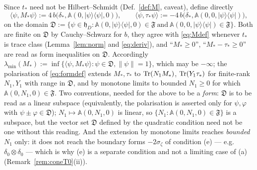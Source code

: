 \documentclass[11pt]{article}
\newcommand{\hh}{\mathfrak h}
\newcommand{\Aop}{\mathbb A}
\begin{document}
\begin{definition}\label{def:forms}
Since $t_*$ need not be Hilbert--Schmidt (Def.~\ref{def:M}, caveat), define directly
\begin{equation}\label{eq:formdef}
 \langle\psi,M_*\psi\rangle:=4\,b\bigl(\delta_*,\Aop(0,|\psi\rangle\langle\psi|,0)\bigr),
 \qquad
 \langle\psi,\tau_*\psi\rangle:=-4\,b\bigl(\delta_*,\Aop(0,0,|\psi\rangle\langle\psi|)\bigr),
\end{equation}
on the domain
$\mathfrak D:=\{\psi\in\hh_D:\Aop(0,|\psi\rangle\langle\psi|,0)\in\mathfrak F\ \text{and}\
\Aop(0,0,|\psi\rangle\langle\psi|)\in\mathfrak F\}$.  Both are finite on $\mathfrak D$ by
Cauchy--Schwarz for $b$, they agree with \eqref{eq:Mdef} whenever $t_*$ is trace class
(Lemma~\ref{lem:norm} and \eqref{eq:deriv}), and ``$M_*\ge0$'', ``$M_*-\tau_*\ge0$'' are
read as form inequalities on $\mathfrak D$.  Accordingly
$\lambda_{\min}(M_*):=\inf\{\langle\psi,M_*\psi\rangle:\psi\in\mathfrak D,\|\psi\|=1\}$,
which may be $-\infty$; the polarisation of \eqref{eq:formdef} extends $M_*,\tau_*$ to
$\operatorname{Tr}(N_1M_*)$, $\operatorname{Tr}(Y_1\tau_*)$ for finite-rank $N_1,Y_1$ with range in $\mathfrak D$, and
by monotone limits to bounded $N_1\ge0$ for which $\Aop(0,N_1,0)\in\mathfrak F$.  Two
conventions, needed for the above to be a \emph{form}: $\mathfrak D$ is to be read as a
linear subspace (equivalently, the polarisation is asserted only for $\psi,\varphi$ with
$\psi\pm\varphi\in\mathfrak D$); $N_1\mapsto\Aop(0,N_1,0)$ is linear, so
$\{N_1:\Aop(0,N_1,0)\in\mathfrak F\}$ is a subspace, but the vector set $\mathfrak D$
defined by the quadratic condition need not be one without this reading.  And the extension
by monotone limits reaches \emph{bounded} $N_1$ only: it does not reach the boundary forms
$-2\sigma_\zeta$ of condition (e) --- e.g.\ $\delta_0\otimes\delta_0$ --- which is why (e)
is a separate condition and not a limiting case of (a) (Remark~\ref{rem:coneT0}(ii)).
\end{definition}
\end{document}
